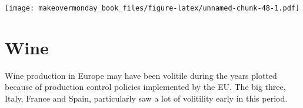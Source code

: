 \documentclass[]{book}
\newenvironment{Shaded}{\begin{snugshade}}{\end{snugshade}}
\newcommand{\KeywordTok}[1]{\textcolor[rgb]{0.13,0.29,0.53}{\textbf{#1}}}
\newcommand{\StringTok}[1]{\textcolor[rgb]{0.31,0.60,0.02}{#1}}
\newcommand{\OperatorTok}[1]{\textcolor[rgb]{0.81,0.36,0.00}{\textbf{#1}}}
\newcommand{\NormalTok}[1]{#1}
\theoremstyle{definition}
\theoremstyle{definition}
\theoremstyle{definition}
\theoremstyle{remark}
\begin{document}
\texttt{[image: makeovermonday\_book\_files/figure-latex/unnamed-chunk-48-1.pdf]}

\chapter{Wine}\label{wine}

Wine production in Europe may have been volitile during the years
plotted because of production control policies implemented by the EU.
The big three, Italy, France and Spain, particularly saw a lot of
volitility early in this period.

\begin{Shaded}
\end{Shaded}
\end{document}
